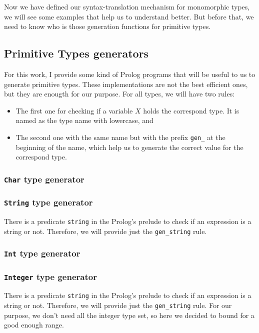 \documentclass{report}
\theoremstyle{definition}
\theoremstyle{definition}
\newcommand{\ttt}[1]{\texttt{#1}}
\begin{document}
Now we have defined our syntax-translation mechanism for monomorphic types, we will see some examples that help us to understand better. But before that, we need to know who is those generation functions for primitive types.
\subsection{Primitive Types generators}
For this work, I provide some kind of Prolog programs that will be useful to us to generate primitive types. These implementations are not the best efficient ones, but they are enougth for our purpose. For all types, we will have two rules:
\begin{itemize}
	\item The first one for checking if a variable $X$ holds the correspond type. It is named as the type name with lowercase, and
	\item The second one with the same name but with the prefix \ttt{gen\_} at the beginning of the name, which help us to generate the correct value for the correspond type.
\end{itemize}
\subsubsection{\ttt{Char} type generator}

\subsubsection{\ttt{String} type generator}
There is a predicate \ttt{string} in the Prolog's prelude to check if an expression is a string or not. Therefore, we will provide just the \ttt{gen\_string} rule.

\subsubsection{\ttt{Int} type generator}

\subsubsection{\ttt{Integer} type generator}
There is a predicate \ttt{string} in the Prolog's prelude to check if an expression is a string or not. Therefore, we will provide just the \ttt{gen\_string} rule. For our purpose, we don't need all the integer type set, so here we decided to bound for a good enough range.

\end{document}
